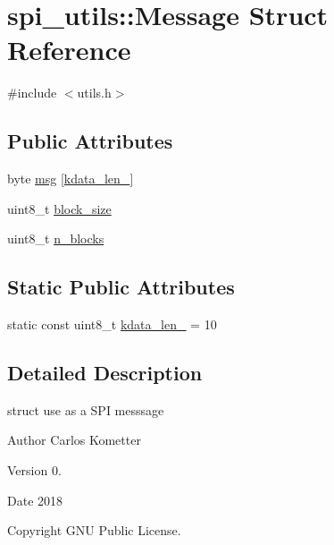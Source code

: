 \hypertarget{structspi__utils_1_1Message}{}\section{spi\+\_\+utils\+:\+:Message Struct Reference}
\label{structspi__utils_1_1Message}


{\ttfamily \#include $<$utils.\+h$>$}

\subsection*{Public Attributes}
\begin{DoxyCompactItemize}
\item 
byte \mbox{\hyperlink{structspi__utils_1_1Message_aef999e9fd6fe0d4ab21aa2a6bf740f55}{msg}} \mbox{[}\mbox{\hyperlink{structspi__utils_1_1Message_a47848d542d0954679bad7a40dc5b0064}{kdata\+\_\+len\+\_\+}}\mbox{]}
\item 
uint8\+\_\+t \mbox{\hyperlink{structspi__utils_1_1Message_a778bc7823110409e3009c773816521be}{block\+\_\+size}}
\item 
uint8\+\_\+t \mbox{\hyperlink{structspi__utils_1_1Message_a00d125aa721450f39c7ae0310090af65}{n\+\_\+blocks}}
\end{DoxyCompactItemize}
\subsection*{Static Public Attributes}
\begin{DoxyCompactItemize}
\item 
static const uint8\+\_\+t \mbox{\hyperlink{structspi__utils_1_1Message_a47848d542d0954679bad7a40dc5b0064}{kdata\+\_\+len\+\_\+}} = 10
\end{DoxyCompactItemize}


\subsection{Detailed Description}
struct use as a S\+PI messsage \begin{DoxyAuthor}{Author}
Carlos Kometter 
\end{DoxyAuthor}
\begin{DoxyVersion}{Version}
0. 
\end{DoxyVersion}
\begin{DoxyDate}{Date}
2018 
\end{DoxyDate}
\begin{DoxyCopyright}{Copyright}
G\+NU Public License. 
\end{DoxyCopyright}


